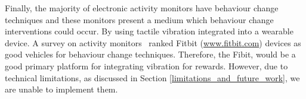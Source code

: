 Finally, the majority of electronic activity monitors have behaviour change techniques and these monitors present a medium which behaviour change interventions could occur. By using tactile vibration integrated into a wearable device. A survey on activity monitors~\cite{article_wearable_good} ranked Fitbit (\url{www.fitbit.com}) devices as good vehicles for behaviour change techniques. Therefore, the Fibit, would be a good primary platform for integrating vibration for rewards. However, due to technical limitations, as discussed in Section \ref{limitations_and_future_work}, we are unable to implement them.

